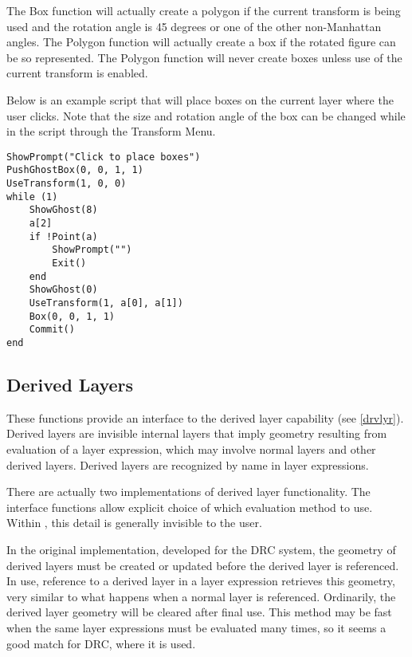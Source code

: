 \begin{description}
The {\vt Box} function will actually create a polygon if the current
transform is being used and the rotation angle is 45 degrees or one of
the other non-Manhattan angles.  The {\vt Polygon} function will
actually create a box if the rotated figure can be so represented. 
The {\vt Polygon} function will never create boxes unless use of the
current transform is enabled.

Below is an example script that will place boxes on the current layer
where the user clicks.  Note that the size and rotation angle of the
box can be changed while in the script through the {\cb Transform
Menu}.

\begin{verbatim}
ShowPrompt("Click to place boxes")
PushGhostBox(0, 0, 1, 1)
UseTransform(1, 0, 0)
while (1)
    ShowGhost(8)
    a[2]
    if !Point(a)
        ShowPrompt("")
        Exit()
    end
    ShowGhost(0)
    UseTransform(1, a[0], a[1])
    Box(0, 0, 1, 1)
    Commit()
end
\end{verbatim}

\end{description}


\subsection{Derived Layers}
\label{drvlyrfunc}

These functions provide an interface to the derived layer capability
(see \ref{drvlyr}).  Derived layers are invisible internal layers that
imply geometry resulting from evaluation of a layer expression, which
may involve normal layers and other derived layers.  Derived layers
are recognized by name in layer expressions.

There are actually two implementations of derived layer functionality. 
The interface functions allow explicit choice of which evaluation
method to use.  Within {\Xic}, this detail is generally invisible to
the user.

In the original implementation, developed for the DRC system, the
geometry of derived layers must be created or updated before the
derived layer is referenced.  In use, reference to a derived layer in
a layer expression retrieves this geometry, very similar to what
happens when a normal layer is referenced.  Ordinarily, the derived
layer geometry will be cleared after final use.  This method may be
fast when the same layer expressions must be evaluated many times, so
it seems a good match for DRC, where it is used.

